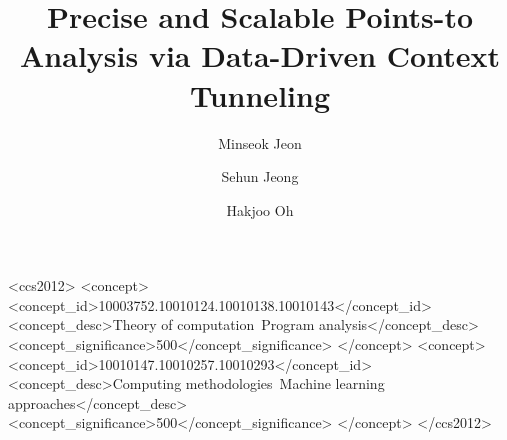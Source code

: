 \documentclass[acmsmall, screen]{acmart}
\begin{document}


\title{Precise and Scalable Points-to Analysis via Data-Driven Context
  Tunneling}

\author{Minseok Jeon}
\author{Sehun Jeong} 
\author{Hakjoo Oh}


\begin{CCSXML}
	<ccs2012>
	<concept>
	<concept_id>10003752.10010124.10010138.10010143</concept_id>
	<concept_desc>Theory of computation~Program analysis</concept_desc>
	<concept_significance>500</concept_significance>
	</concept>
	<concept>
	<concept_id>10010147.10010257.10010293</concept_id>
	<concept_desc>Computing methodologies~Machine learning approaches</concept_desc>
	<concept_significance>500</concept_significance>
	</concept>
	</ccs2012>
\end{CCSXML}
\end{document}

